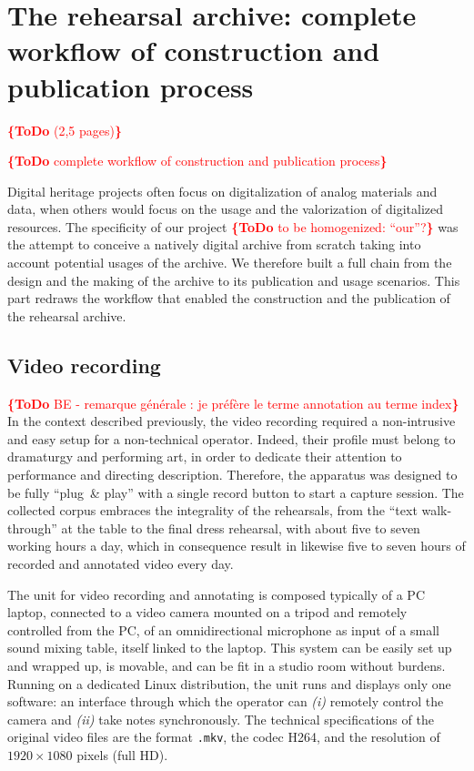 \documentclass[conference]{IEEEtran}
\newcommand{\todo}[1]{\noindent\textcolor{red}{{\bf \{ToDo} #1{\bf \}}}}
\begin{document}
\section{The rehearsal archive: complete workflow of construction and publication process}
\todo{(2,5 pages)}

\todo{complete workflow of construction and publication process}

Digital heritage projects often focus on digitalization of analog materials and data,
when others would focus on the usage and the valorization of digitalized resources.
The specificity of our project \todo{to be homogenized: ``our''?}
was the attempt to conceive a natively digital archive from scratch
taking into account potential usages of the archive.
We therefore built a full chain from the design and the making of the archive
to its publication and usage scenarios.
This part redraws the workflow that enabled the construction and the publication of the rehearsal archive.

\subsection{Video recording}
\todo{BE - remarque générale : je préfère le terme annotation au terme index}
In the context described previously, the video recording required a non-intrusive and easy setup for a non-technical operator. Indeed, their profile must belong to dramaturgy and performing art, in order to dedicate their attention to performance and directing description. Therefore, the apparatus was designed to be fully ``plug\ \& play'' with a single record button to start a capture session.
The collected corpus embraces the integrality of the rehearsals, from the ``text walk-through'' at the table to the final dress rehearsal, with about five to seven working hours a day, which in consequence result in likewise five to seven hours of recorded and annotated video every day.

The unit for video recording and annotating is composed typically of a PC laptop, connected to a video camera mounted on a tripod and remotely controlled from the PC, of an omnidirectional microphone as input of a small sound mixing table, itself linked to the laptop. This system can be easily set up and wrapped up, is movable, and can be fit in a studio room without burdens. Running on a dedicated Linux distribution, the unit runs and displays only one software: an interface through which the operator can \emph{(i)} remotely control the camera and \emph{(ii)} take notes synchronously. 
The technical specifications of the original video files are the format \texttt{.mkv}, the codec H264, and the resolution of $1920 \times 1080$ pixels (full HD).
\end{document}
